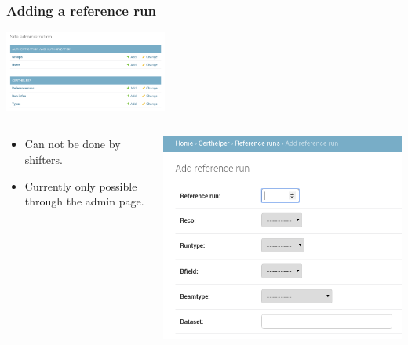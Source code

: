 \documentclass{beamer}
\begin{document}
\begin{frame}
  \frametitle{Adding a reference run}
  \begin{center}
  \includegraphics[width=0.4\textwidth]{figures/admin_1.png}
  \end{center}
  \begin{columns}[T]
    \begin{column}{.5\textwidth}
    \begin{block}{}
	\begin{itemize}
	\item Can not be done by shifters.
	\item Currently only possible through the admin page.
	\end{itemize}
   	\end{block}	
    \end{column}
    \begin{column}{.5\textwidth}
    \begin{block}{}
		\includegraphics[width=\textwidth]{figures/admin_2.png}
    \end{block}
  \end{column}
\end{columns}
\end{frame}
\end{document}
